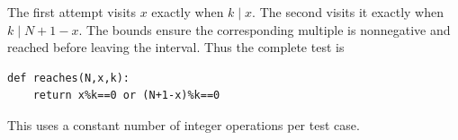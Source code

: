 The first attempt visits $x$ exactly when $k\mid x$. The second visits it exactly when $k\mid N+1-x$. The bounds ensure the corresponding multiple is nonnegative and reached before leaving the interval. Thus the complete test is\begin{verbatim}
def reaches(N,x,k):
    return x%k==0 or (N+1-x)%k==0
\end{verbatim}
This uses a constant number of integer operations per test case.
